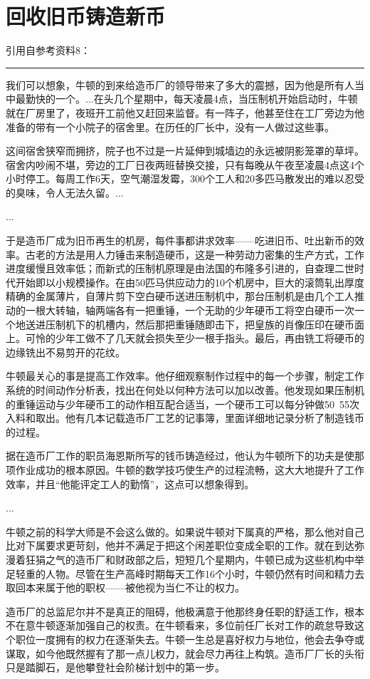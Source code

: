 \documentclass[12pt,oneside]{book}
\newcommand\hr{\par\noindent\hrule}
\begin{document}
\section{回收旧币铸造新币}
引用自参考资料8：

\hr 
我们可以想象，牛顿的到来给造币厂的领导带来了多大的震撼，因为他是所有人当中最勤快的一个。...在头几个星期中，每天凌晨4点，当压制机开始启动时，牛顿就在厂房里了，夜班开工前他又赶回来监督。有一阵子，他甚至住在工厂旁边为他准备的带有一个小院子的宿舍里。在历任的厂长中，没有一人做过这些事。

这间宿舍狭窄而拥挤，院子也不过是一片延伸到城墙边的永远被阴影笼罩的草坪。宿舍内吵闹不堪，旁边的工厂日夜两班替换交接，只有每晚从午夜至凌晨4点这4个小时停工。每周工作6天，空气潮湿发霉，300个工人和20多匹马散发出的难以忍受的臭味，令人无法久留。...

...

于是造币厂成为旧币再生的机房，每件事都讲求效率——吃进旧币、吐出新币的效率。古老的方法是用人力锤击来制造硬币，这是一种劳动力密集的生产方式，工作进度缓慢且效率低；而新式的压制机原理是由法国的布隆多引进的，自查理二世时代开始即以小规模操作。在由50匹马供应动力的10个机房中，巨大的滚筒轧出厚度精确的金属薄片，自薄片剪下空白硬币送进压制机中，那台压制机是由几个工人推动的一根大转轴，轴两端各有一把重锤，一个无助的少年硬币工将空白硬币一次一个地送进压制机下的机槽内，然后那把重锤随即击下，把皇族的肖像压印在硬币面上。可怜的少年工做不了几天就会损失至少一根手指头。最后，再由铣工将硬币的边缘铣出不易剪开的花纹。

牛顿最关心的事是提高工作效率。他仔细观察制作过程中的每一个步骤，制定工作系统的时间动作分析表，找出在何处以何种方法可以加以改善。他发现如果压制机的重锤运动与少年硬币工的动作相互配合适当，一个硬币工可以每分钟做50~55次入料和取出。他有几本记载造币厂工艺的记事簿，里面详细地记录分析了制造钱币的过程。

据在造币厂工作的职员海恩斯所写的钱币铸造经过，他认为牛顿所下的功夫是使那项作业成功的根本原因。牛顿的数学技巧使生产的过程流畅，这大大地提升了工作效率，并且“他能评定工人的勤惰”，这点可以想象得到。

...

牛顿之前的科学大师是不会这么做的。如果说牛顿对下属真的严格，那么他对自己比对下属要求更苛刻，他并不满足于把这个闲差职位变成全职的工作。就在到达弥漫着狂狷之气的造币厂和财政部之后，短短几个星期内，牛顿已成为这些机构中举足轻重的人物。尽管在生产高峰时期每天工作16个小时，牛顿仍然有时间和精力去取回本来属于他的职权——被他视为当仁不让的权力。

造币厂的总监尼尔并不是真正的阻碍，他极满意于他那终身任职的舒适工作，根本不在意牛顿逐渐加强自己的权责。在牛顿看来，多位前任厂长对工作的疏怠导致这个职位一度拥有的权力在逐渐失去。牛顿一生总是喜好权力与地位，他会去争夺或谋取，如今他既然握有了那一点儿权力，就会尽力再往上构筑。造币厂厂长的头衔只是踏脚石，是他攀登社会阶梯计划中的第一步。
\end{document}
